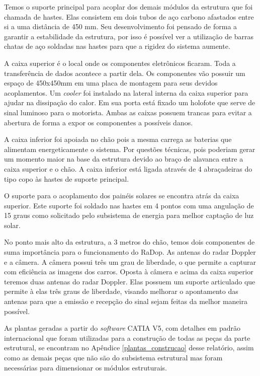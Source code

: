 Temos o suporte principal para acoplar dos demais módulos da estrutura que foi chamada de hastes. Elas consistem em dois tubos de aço carbono afastados entre si a uma distância de 450 mm. Seu desenvolvimento foi pensado de forma a garantir a estabilidade da estrutura, por isso é possível ver a utilização de barras chatas de aço soldadas nas hastes para que a rigidez do sistema aumente.

A caixa superior é o local onde os componentes eletrônicos ficaram. Toda a transferência de dados acontece a partir dela. Os componentes vão possuir um espaço de 450x450mm em uma placa de montagem para seus devidos acoplamentos. Um \textit{cooler} foi instalado na lateral interna da caixa superior para ajudar na dissipação do calor. Em sua porta está fixado um holofote que serve de sinal luminoso para o motorista. Ambas as caixas possuem trancas para evitar a abertura de forma a expor os componentes a possíveis danos. 

A caixa inferior foi apoiada no chão pois a mesma carrega as baterias que alimentam energeticamente o sistema. Por questões técnicas, pois poderiam gerar um momento maior na base da estrutura devido ao braço de alavanca entre a caixa superior e o chão. A caixa inferior está ligada através de 4 abraçadeiras do tipo copo às hastes de suporte principal.

O suporte para o acoplamento dos painéis solares se encontra atrás da caixa superior. Este suporte foi soldado nas hastes em 4 pontos com uma angulação de 15 graus como solicitado pelo subsistema de energia para melhor captação de luz solar. 

No ponto mais alto da estrutura, a 3 metros do chão, temos dois componentes de suma importância para o funcionamento do RaDop. As antenas do radar Doppler e a câmera. A câmera possui três um grau de liberdade, o que permite a capturar com eficiência as imagens dos carros. Oposta à câmera e acima da caixa superior teremos duas antenas do radar Doppler. Elas possuem um suporte articulado que permite à elas três graus de liberdade, visando melhorar o apontamento das antenas para que a emissão e recepção do sinal sejam feitas da melhor maneira possível.

As plantas geradas a partir do \textit{software} CATIA V5, com detalhes em padrão internacional que foram utilizadas para a construção de todas as peças da parte estrutural, se encontram no Apêndice \ref{plantas_construcao} desse relatório, assim como as demais peças que não são do subsistema estrutural mas foram necessárias para dimensionar os módulos estruturais.

